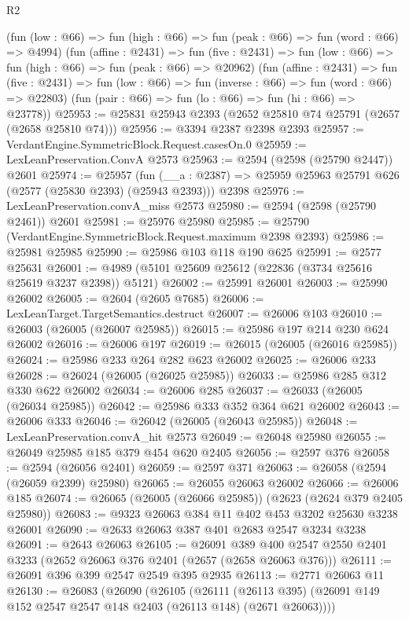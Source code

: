\begin{lexlean}{R2}
\begin{coremodule}
      (fun (low : @66) => fun (high : @66) => fun (peak : @66) => fun (word : @66) => @4994)
      (fun (affine : @2431) =>
      fun (five : @2431) => fun (low : @66) => fun (high : @66) => fun (peak : @66) => @20962)
      (fun (affine : @2431) =>
      fun (five : @2431) => fun (low : @66) => fun (inverse : @66) => fun (word : @66) => @22803)
      (fun (pair : @66) => fun (lo : @66) => fun (hi : @66) => @23778))
@25953 := @25831 @25943 @2393 (@2652 @25810 @74 @25791 (@2657 (@2658 @25810 @74)))
@25956 := @3394 @2387 @2398 @2393
@25957 := VerdantEngine.SymmetricBlock.Request.casesOn.{0}
@25959 := LexLeanPreservation.ConvA @2573
@25963 := @2594 (@2598 (@25790 @2447)) @2601
@25974 := @25957
    (fun (__a : @2387) => @25959 @25963 @25791 @626 (@2577 (@25830 @2393) (@25943 @2393)))
    @2398
@25976 := LexLeanPreservation.convA_miss @2573
@25980 := @2594 (@2598 (@25790 @2461)) @2601
@25981 := @25976 @25980
@25985 := @25790 (VerdantEngine.SymmetricBlock.Request.maximum @2398 @2393)
@25986 := @25981 @25985
@25990 := @25986 @103 @118 @190 @625
@25991 := @2577 @25631
@26001 := @4989 (@5101 @25609 @25612 (@22836 (@3734 @25616 @25619 @3237 @2398)) @5121)
@26002 := @25991 @26001
@26003 := @25990 @26002
@26005 := @2604 (@2605 @7685)
@26006 := LexLeanTarget.TargetSemantics.destruct
@26007 := @26006 @103
@26010 := @26003 (@26005 (@26007 @25985))
@26015 := @25986 @197 @214 @230 @624 @26002
@26016 := @26006 @197
@26019 := @26015 (@26005 (@26016 @25985))
@26024 := @25986 @233 @264 @282 @623 @26002
@26025 := @26006 @233
@26028 := @26024 (@26005 (@26025 @25985))
@26033 := @25986 @285 @312 @330 @622 @26002
@26034 := @26006 @285
@26037 := @26033 (@26005 (@26034 @25985))
@26042 := @25986 @333 @352 @364 @621 @26002
@26043 := @26006 @333
@26046 := @26042 (@26005 (@26043 @25985))
@26048 := LexLeanPreservation.convA_hit @2573
@26049 := @26048 @25980
@26055 := @26049 @25985 @185 @379 @454 @620 @2405
@26056 := @2597 @376
@26058 := @2594 (@26056 @2401)
@26059 := @2597 @371
@26063 := @26058 (@2594 (@26059 @2399) @25980)
@26065 := @26055 @26063 @26002
@26066 := @26006 @185
@26074 := @26065 (@26005 (@26066 @25985)) (@2623 (@2624 @379 @2405 @25980))
@26083 := @9323 @26063 @384 @11 @402 @453 @3202 @25630 @3238 @26001
@26090 := @2633 @26063 @387 @401 @2683 @2547 @3234 @3238
@26091 := @2643 @26063
@26105 := @26091
    @389
    @400
    @2547
    @2550
    @2401
    @3233
    (@2652 @26063 @376 @2401 (@2657 (@2658 @26063 @376)))
@26111 := @26091 @396 @399 @2547 @2549 @395 @2935
@26113 := @2771 @26063 @11
@26130 := @26083
    (@26090
      (@26105
        (@26111
          (@26113 @395)
          (@26091 @149 @152 @2547 @2547 @148 @2403 (@26113 @148) (@2671 @26063))))

\end{coremodule}
\end{lexlean}
